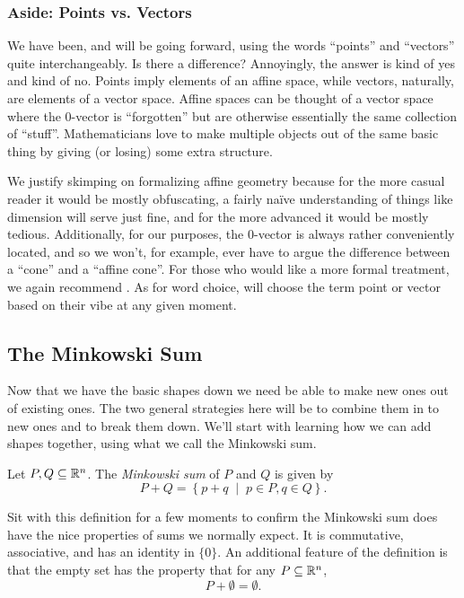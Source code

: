 \documentclass[12pt,oneside]{../../sfsuthesis}
\begin{document}
\subsubsection{Aside: Points vs. Vectors}
We have been, and will be going forward, using the words ``points'' and ``vectors'' quite interchangeably.
Is there a difference?
Annoyingly, the answer is kind of yes and kind of no.
Points imply elements of an affine space, while vectors, naturally, are elements of a vector space.
Affine spaces can be thought of a vector space where the \( 0 \)-vector is ``forgotten'' but are otherwise essentially the same collection of ``stuff''.
Mathematicians love to make multiple objects out of the same basic thing by giving (or losing) some extra structure.

We justify skimping on formalizing affine geometry because for the more casual reader it would be mostly obfuscating, a fairly na\"ive understanding of things like dimension will serve just fine, and for the more advanced it would be mostly tedious.
Additionally, for our purposes, the \( 0 \)-vector is always rather conveniently located, and so we won't, for example, ever have to argue the difference between a ``cone'' and a ``affine cone''.
For those who would like a more formal treatment, we again recommend \cite{zieglerLecturesPolytopes1995}.
As for word choice, will choose the term point or vector based on their vibe at any given moment.

\subsection{The Minkowski Sum}
Now that we have the basic shapes down we need be able to make new ones out of existing ones.
The two general strategies here will be to combine them in to new ones and to break them down.
We'll start with learning how we can add shapes together, using what we call the Minkowski sum.
\begin{definition}\th\label{def:MinkowskiSum}
    Let \( P, Q \subseteq \mathbb{R}^n \).
    The \emph{Minkowski sum} of \( P \) and \( Q \) is given by
    \[
        P + Q = \left\{ p + q \; \middle| \; p \in P, q \in Q \right\}.
    \]
\end{definition}
Sit with this definition for a few moments to confirm the Minkowski sum does have the nice properties of sums we normally expect.
It is commutative, associative, and has an identity in \( \{ 0 \} \).
An additional feature of the definition is that the empty set has the property that for any \( P \subseteq \mathbb{R}^n \),
\[
    P + \emptyset = \emptyset.
\]
\end{document}
